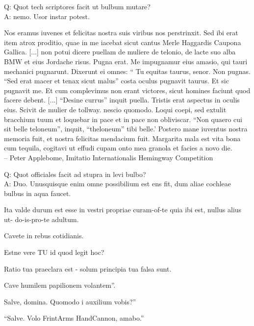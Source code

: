 \documentclass[titlepage,12pt]{memoir}
\begin{document}
Q: Quot tech scriptores facit ut bulbum mutare?\\
A: nemo. Usor instar potest.

Nos eramus iuvenes et felicitas nostra suis viribus nos perstrinxit. Sed ibi erat
item atrox proditio, quae in me iacebat sicut cantus Merle Haggardis
Caupona Gallica. [...]
non potui dicere puellam de muliere de telonio, de lacte suo
alba BMW et eius Jordache risus. Pugna erat. Me impugnamur eius
amasio, qui tauri mechanici pugnarunt. Dixerunt ei omnes: “ Tu equitas
taurus, senor. Non pugnas. “Sed erat macer et tenax sicut malus”
costa oculus pugnavit taurus. Et sic pugnavit me. Et cum complevimus
non erant victores, sicut homines faciunt quod facere debent. [...]
“Desine currus” inquit puella.
Tristis erat aspectus in oculis eius. Scivit de
mulier de tollway. nescio quomodo. Loqui coepi, sed extulit
bracchium tuum et loquebar in pace et in pace non obliviscar.
“Non quaero cui sit belle teloneum”, inquit, “theloneum”
tibi belle.’
Postero mane iuventus nostra memoria fuit, et nostra felicitas mendacium fuit.
Margarita mala est vita bona cum tequila, cogitavi ut effudi cupam
onto mea granola et facies a novo die.
\\-- Peter Applebome, Imitatio Internationalis Hemingway
Competition

Q: Quot officiales facit ad stupra in levi bulbo?\\
A: Duo. Unusquisque enim omne possibilium est ens
fit, dum aliae cochleae bulbus in aqua faucet.

Ita valde durum est esse
in vestri propriae curam-of-te quia ibi est, nullus alius ut- do-is-pro-te
adultum.

Cavete in rebus cotidianis.

Estne vere TU id quod legit hoc?

Ratio tua praeclara est - solum principia tua falsa sunt.

Cave humilem papilionem volantem”.

Salve, domina. Quomodo i auxilium vobis?”

“Salve. Volo FrintArms HandCannon, amabo.”
\end{document}
